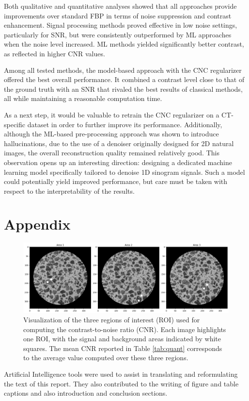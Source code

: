\documentclass{article}
\begin{document}
Both qualitative and quantitative analyses showed that all approaches provide improvements over standard FBP in terms of noise suppression and contrast enhancement. Signal processing methods proved effective in low noise settings, particularly for SNR, but were consistently outperformed by ML approaches when the noise level increased. ML methods yielded significantly better contrast, as reflected in higher CNR values.
\medskip

Among all tested methods, the model-based approach with the CNC regularizer offered the best overall performance. It combined a contrast level close to that of the ground truth with an SNR that rivaled the best results of classical methods, all while maintaining a reasonable computation time.
\medskip

As a next step, it would be valuable to retrain the CNC regularizer on a CT-specific dataset in order to further improve its performance. Additionally, although the ML-based pre-processing approach was shown to introduce hallucinations, due to the use of a denoiser originally designed for 2D natural images, the overall reconstruction quality remained relatively good. This observation opens up an interesting direction: designing a dedicated machine learning model specifically tailored to denoise 1D sinogram signals. Such a model could potentially yield improved performance, but care must be taken with respect to the interpretability of the results. 






\newpage
\section{Appendix}
\begin{figure}[H]
    \centering
    \includegraphics[scale=0.3]{figures/CNR_area.png}
    \caption{Visualization of the three regions of interest (ROI) used for computing the contrast-to-noise ratio (CNR). Each image highlights one ROI, with the signal and background areas indicated by white squares. The mean CNR reported in Table \ref{tab:quant} corresponds to the average value computed over these three regions.}
    \label{fig:CNR_area}
\end{figure}
\newpage
\printbibliography
Artificial Intelligence tools were used to assist in translating and reformulating the text of this report. They also contributed to the writing of figure and table captions and also introduction and conclusion sections.
\end{document}
